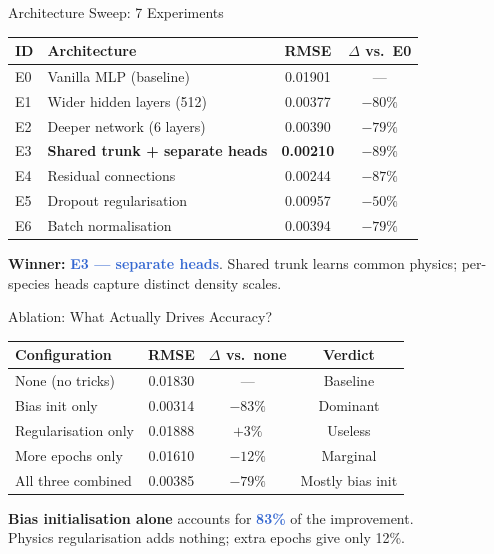 \documentclass[aspectratio=169]{beamer}
\newcommand{\hlnum}[1]{\textcolor{highlight}{\textbf{#1}}}
\newcommand{\good}[1]{\textcolor{good}{#1}}
\newcommand{\bad}[1]{\textcolor{bad}{#1}}
\begin{document}
\begin{frame}{Architecture Sweep: 7 Experiments}
\centering
\begin{table}
\centering
\begin{tabular}{@{}llcc@{}}
\toprule
\textbf{ID} & \textbf{Architecture} & \textbf{RMSE} & \textbf{$\Delta$ vs.\ E0} \\
\midrule
E0 & Vanilla MLP (baseline)             & 0.01901 & --- \\
E1 & Wider hidden layers (512)          & 0.00377 & $-80\%$ \\
E2 & Deeper network (6 layers)          & 0.00390 & $-79\%$ \\
\rowcolor{good!15}
E3 & \textbf{Shared trunk + separate heads} & \good{\textbf{0.00210}} & \good{$-89\%$} \\
E4 & Residual connections               & 0.00244 & $-87\%$ \\
E5 & Dropout regularisation             & 0.00957 & $-50\%$ \\
E6 & Batch normalisation                & 0.00394 & $-79\%$ \\
\bottomrule
\end{tabular}
\end{table}

\vspace{0.5em}
\textbf{Winner:} \hlnum{E3 --- separate heads}. Shared trunk learns common physics; per-species heads capture distinct density scales.
\end{frame}

\begin{frame}{Ablation: What Actually Drives Accuracy?}
\centering
\begin{table}
\centering
\begin{tabular}{@{}lccc@{}}
\toprule
\textbf{Configuration} & \textbf{RMSE} & \textbf{$\Delta$ vs.\ none} & \textbf{Verdict} \\
\midrule
None (no tricks)           & 0.01830 & ---          & Baseline \\
Bias init only             & 0.00314 & $-83\%$      & \good{Dominant} \\
Regularisation only        & 0.01888 & $+3\%$       & \bad{Useless} \\
More epochs only           & 0.01610 & $-12\%$      & Marginal \\
All three combined         & 0.00385 & $-79\%$      & Mostly bias init \\
\bottomrule
\end{tabular}
\end{table}

\vspace{0.8em}
\textbf{Bias initialisation alone} accounts for \hlnum{83\%} of the improvement.\\
Physics regularisation adds nothing; extra epochs give only 12\%.
\end{frame}
\end{document}
